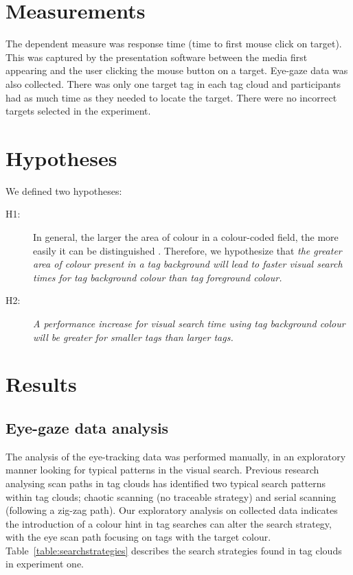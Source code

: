 \section{Measurements}\label{sect:measurements}

The dependent measure was response time (time to first mouse click on target). This was captured by the presentation software between the media first appearing and the user clicking the mouse button on a target. Eye-gaze data was also collected. There was only one target tag in each tag cloud and participants had as much time as they needed to locate the target. There were no incorrect targets selected in the experiment.

\section{Hypotheses} \label{sect:exp1hypotheses}
 
We defined two hypotheses:

\begin{description}
\item[H1:]In general, the larger the area of colour in a colour-coded field, the more easily it can be distinguished \citep[pg 125, ch 4][]{ware04}. Therefore, we hypothesize that \textit{the greater area of colour present in a tag background will lead to faster visual search times for tag background colour than tag foreground colour.}
\item[H2:]\textit{A performance increase for visual search time using tag background colour will be greater for smaller tags than larger tags.}
\end{description}

\section{Results}\label{sect:exp1results}

\subsection{Eye-gaze data analysis} \label{subsect:eyegaze}
The analysis of the eye-tracking data was performed manually, in an exploratory manner looking for typical patterns in the visual search. Previous research \cite{schrammel09b} analysing scan paths in tag clouds has identified two typical search patterns within tag clouds; chaotic scanning (no traceable strategy) and serial scanning (following a zig-zag path). Our exploratory analysis on collected data indicates the introduction of a colour hint in tag searches can alter the search strategy, with the eye scan path focusing on tags with the target colour. Table~\vref{table:searchstrategies} describes the search strategies found in tag clouds in experiment one.

